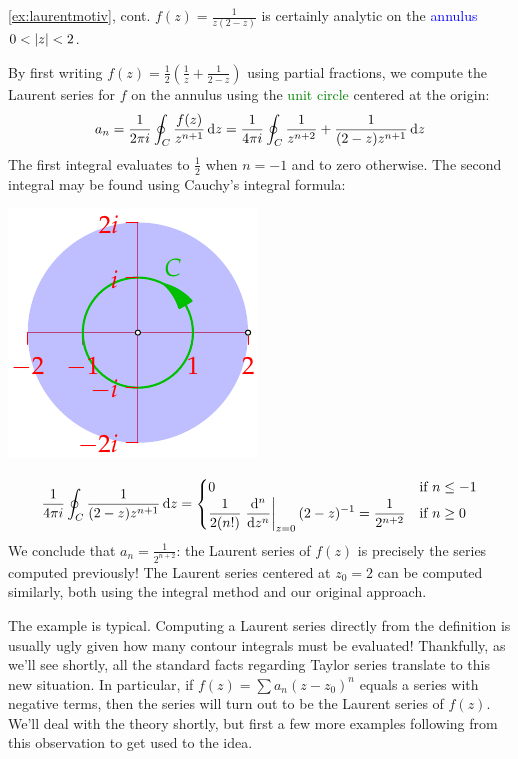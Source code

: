 \begin{example*}{\ref{ex:laurentmotiv}, cont.}{}
	$f(z)=\frac 1{z(2-z)}$ is certainly analytic on the \textcolor{blue}{annulus} $0<\nm z<2$.\par
	\begin{minipage}[t]{0.7\linewidth}\vspace{-4pt}
		By first writing $f(z)=\frac 12\left(\frac 1{z}+\frac 1{2-z}\right)$ using partial fractions, we compute the Laurent series for $f$ on the annulus using the \textcolor{Green}{unit circle} centered at the origin:
		\[
			a_n=\frac 1{2\pi i}\oint_C\frac{f(z)}{z^{n+1}}\,\dz =\frac 1{4\pi i}\oint_C \frac{1}{z^{n+2}}+\frac 1{(2-z)z^{n+1}}\,\dz
		\]
		The first integral evaluates to $\frac 12$ when $n=-1$ and to zero otherwise. The second  integral may be found using Cauchy's integral formula:
	\end{minipage}
	\hfill
	\begin{minipage}[t]{0.29\linewidth}\vspace{-4pt}
		\flushright\includegraphics[scale=0.95]{laurent7}
	\end{minipage}\par
	\[
		\frac 1{4\pi i}\oint_C \frac 1{(2-z)z^{n+1}}\,\dz =
		\begin{cases}
			0&\text{if }n\le -1\\
			\displaystyle\frac 1{2(n!)}\diffat[{}^n]{z^n}{z=0}(2-z)^{-1} =\frac 1{2^{n+2}}&\text{if }n\ge 0
		\end{cases}
	\]
	We conclude that $a_n=\frac 1{2^{n+2}}$: the Laurent series of $f(z)$ is precisely the series computed previously!\smallbreak
	The Laurent series centered at $z_0=2$ can be computed similarly, both using the integral method and our original approach. 
\end{example*}

The example is typical. Computing a Laurent series directly from the definition is usually ugly given how many contour integrals must be evaluated! Thankfully, as we'll see shortly, all the standard facts regarding Taylor series translate to this new situation. In particular, if $f(z)=\sum a_n(z-z_0)^n$ equals a series with negative terms, then the series will turn out to be the Laurent series of $f(z)$. We'll deal with the theory shortly, but first a few more examples following from this observation to get used to the idea.



